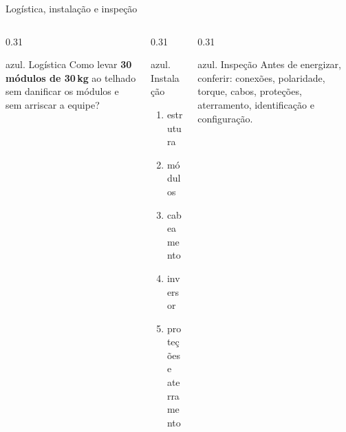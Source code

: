 \documentclass[aspectratio=169,10pt,xcolor=table]{beamer}
\begin{document}
\begin{frame}{Logística, instalação e inspeção}
  \begin{columns}[T]
    \begin{column}{0.31\textwidth}
      \begin{card}[equal height group=lg]{azul}{\faTruck{}. Logística}
        Como levar \textbf{30 módulos de 30\,kg} ao telhado sem danificar os módulos e sem arriscar a equipe?
      \end{card}
    \end{column}
    \begin{column}{0.31\textwidth}
      \begin{card}[equal height group=lg]{azul}{\faWrench{}. Instalação}
        \begin{enumerate}\footnotesize
          \item estrutura
          \item módulos
          \item cabeamento
          \item inversor
          \item proteções e aterramento
        \end{enumerate}
      \end{card}
    \end{column}
    \begin{column}{0.31\textwidth}
      \begin{card}[equal height group=lg]{azul}{\faSearch{}. Inspeção}
        Antes de energizar, conferir: conexões, polaridade, torque, cabos, proteções, aterramento, identificação e configuração.
      \end{card}
    \end{column}
  \end{columns}
\end{frame}
\end{document}
